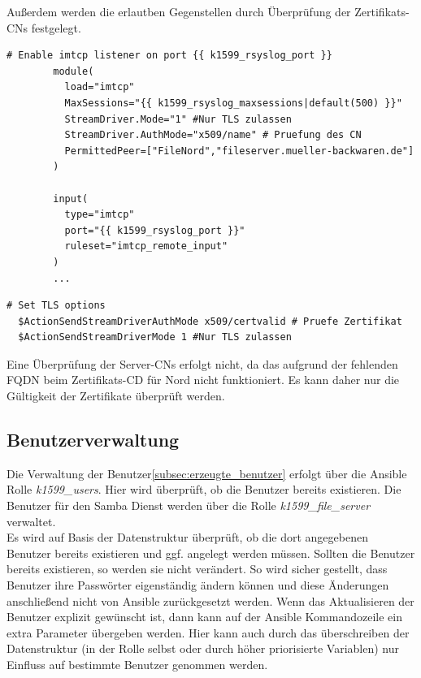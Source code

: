 Außerdem werden die erlautben Gegenstellen durch Überprüfung der Zertifikats-CNs festgelegt.

\begin{lstlisting}[label=code:syslog3,caption=Whitelisting der CN]
        # Enable imtcp listener on port {{ k1599_rsyslog_port }}
        module(
          load="imtcp"
          MaxSessions="{{ k1599_rsyslog_maxsessions|default(500) }}"
          StreamDriver.Mode="1" #Nur TLS zulassen
          StreamDriver.AuthMode="x509/name" # Pruefung des CN
          PermittedPeer=["FileNord","fileserver.mueller-backwaren.de"]
        )

        input(
          type="imtcp"
          port="{{ k1599_rsyslog_port }}"
          ruleset="imtcp_remote_input"
        )
        ...
\end{lstlisting}

\begin{lstlisting}[label=code:syslog4,caption=Clientseitige Prüfung in /etc/rsyslog.d/10\_imtcp\_remote\_output.conf.j2]
  # Set TLS options
  $ActionSendStreamDriverAuthMode x509/certvalid # Pruefe Zertifikat
  $ActionSendStreamDriverMode 1 #Nur TLS zulassen
\end{lstlisting}

Eine Überprüfung der Server-CNs erfolgt nicht, da das aufgrund der fehlenden FQDN beim Zertifikats-CD für Nord nicht funktioniert. Es kann daher nur die Gültigkeit der Zertifikate überprüft werden.

\subsection{Benutzerverwaltung}
Die Verwaltung der Benutzer\ref{subsec:erzeugte_benutzer} erfolgt über die Ansible Rolle \textit{k1599\_users}. Hier wird überprüft, ob die Benutzer bereits existieren. Die Benutzer für den Samba Dienst werden über die Rolle \textit{k1599\_file\_server} verwaltet. \\

Es wird auf Basis der Datenstruktur  überprüft, ob die dort angegebenen Benutzer bereits existieren und ggf. angelegt werden müssen. Sollten die Benutzer bereits existieren, so werden sie nicht verändert. So wird sicher gestellt, dass Benutzer ihre Passwörter eigenständig ändern können und diese Änderungen anschließend nicht von Ansible zurückgesetzt werden. Wenn das Aktualisieren der Benutzer explizit gewünscht ist, dann kann auf der Ansible Kommandozeile ein extra Parameter  übergeben werden.  Hier kann auch durch das überschreiben der Datenstruktur  (in der Rolle selbst oder durch höher priorisierte Variablen) nur Einfluss auf bestimmte Benutzer genommen werden.\\

